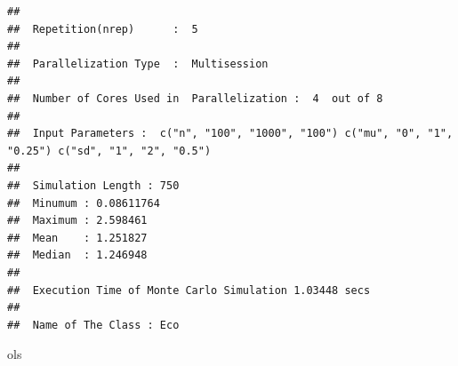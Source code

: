 \documentclass[11pt,a4paper]{article}
\newenvironment{Shaded}{\begin{snugshade}}{\end{snugshade}}
\newcommand{\NormalTok}[1]{#1}
\begin{document}
\begin{verbatim}
## 
##  Repetition(nrep)      :  5 
## 
##  Parallelization Type  :  Multisession 
## 
##  Number of Cores Used in  Parallelization :  4  out of 8 
## 
##  Input Parameters :  c("n", "100", "1000", "100") c("mu", "0", "1", "0.25") c("sd", "1", "2", "0.5") 
## 
##  Simulation Length : 750 
##  Minumum : 0.08611764 
##  Maximum : 2.598461 
##  Mean    : 1.251827 
##  Median  : 1.246948 
## 
##  Execution Time of Monte Carlo Simulation 1.03448 secs 
## 
##  Name of The Class : Eco
\end{verbatim}

\begin{Shaded}
\begin{Highlighting}[]
\NormalTok{ols}
\end{Highlighting}
\end{Shaded}
\end{document}
